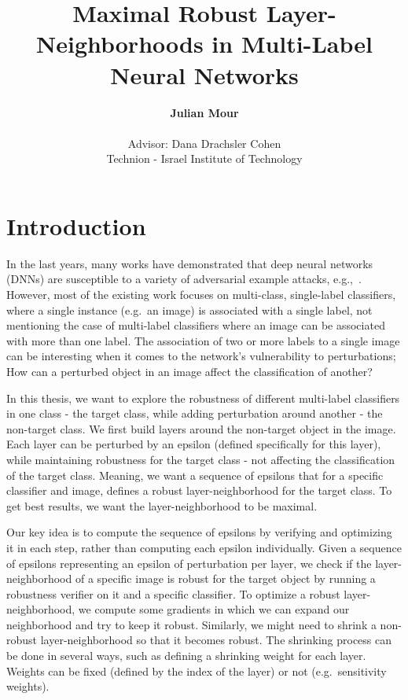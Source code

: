 \documentclass[11pt]{article}
\begin{document}
\title{Maximal Robust Layer-Neighborhoods in Multi-Label Neural Networks}

\author{
    \textbf{Julian Mour} \\
    \\
    Advisor: Dana Drachsler Cohen\\
    Technion - Israel Institute of Technology
}

\maketitle

\section{Introduction}

In the last years, many works have demonstrated that deep neural networks (DNNs) are susceptible to a variety of adversarial example attacks, e.g.,~\cite{ref7,ref15,szegedy2014intriguing,ref17,ref29,ref56}.
However, most of the existing work focuses on multi-class, single-label classifiers, where a single instance (e.g.\ an image) is associated with a single label, not mentioning the case of multi-label classifiers where an image can be associated with more than one label.
The association of two or more labels to a single image can be interesting when it comes to the network's vulnerability to perturbations;
How can a perturbed object in an image affect the classification of another?

In this thesis, we want to explore the robustness of different multi-label classifiers in one class - the target class, while adding perturbation around another - the non-target class.
We first build layers around the non-target object in the image.
Each layer can be perturbed by an epsilon (defined specifically for this layer), while maintaining robustness for the target class - not affecting the classification of the target class.
Meaning, we want a sequence of epsilons that for a specific classifier and image, defines a robust layer-neighborhood for the target class.
To get best results, we want the layer-neighborhood to be maximal.


Our key idea is to compute the sequence of epsilons by verifying and optimizing it in each step, rather than computing each epsilon individually.
Given a sequence of epsilons representing an epsilon of perturbation per layer, we check if the layer-neighborhood of a specific image is robust for the target object by running a robustness verifier on it and a specific classifier.
To optimize a robust layer-neighborhood, we compute some gradients in which we can expand our neighborhood and try to keep it robust.
Similarly, we might need to shrink a non-robust layer-neighborhood so that it becomes robust.
The shrinking process can be done in several ways, such as defining a shrinking weight for each layer.
Weights can be fixed (defined by the index of the layer) or not (e.g.\ sensitivity weights).
 
\end{document}
